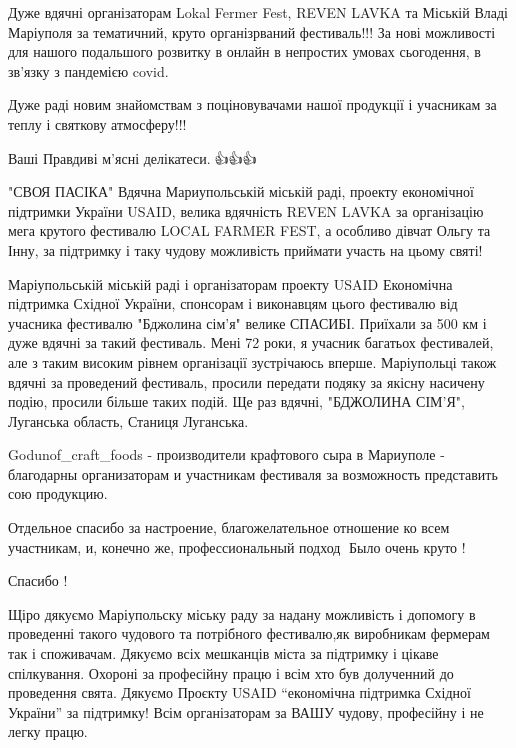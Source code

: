 Дуже вдячні організаторам Lokal Fermer Fest, REVEN LAVKA та Міській Владі
Маріуполя за тематичний, круто організрваний фестиваль!!! За нові можливості
для нашого подальшого розвитку в онлайн в непростих умовах сьогодення, в
зв'язку з пандемією covid.

Дуже раді новим знайомствам з поціновувачами нашої продукції і учасникам за теплу і святкову атмосферу!!!

Ваші Правдиві м'ясні делікатеси.🥰👍👍👍


"СВОЯ ПАСІКА" Вдячна Мариупольській міській раді, проекту економічної підтримки
України USAID, велика вдячність REVEN LAVKA за організацію мега крутого
фестивалю LOCAL FARMER FEST, а особливо дівчат Ольгу та Інну, за підтримку і
таку чудову можливість приймати участь на цьому святі!


Маріупольській міській раді і організаторам проекту USAID Економічна підтримка
Східної України, спонсорам і виконавцям цього фестивалю від учасника фестивалю
"Бджолина сім'я" велике СПАСИБІ. Приїхали за 500 км і дуже вдячні за такий
фестиваль. Мені 72 роки, я учасник багатьох фестивалей, але з таким високим
рівнем організації зустрічаюсь вперше. Маріупольці також вдячні за проведений
фестиваль, просили передати подяку за якісну насичену подію, просили більше
таких подій. Ще раз вдячні, "БДЖОЛИНА СІМ'Я", Луганська область, Станиця
Луганська.


Godunof\_craft\_foods - производители крафтового сыра в Мариуполе - благодарны
организаторам и участникам фестиваля за возможность представить сою продукцию.

Отдельное спасибо за настроение, благожелательное отношение ко всем участникам,
и, конечно же, профессиональный подход👏 Было очень круто !

Спасибо !


Щіро дякуємо Маріупольску міську раду за надану можливість і допомогу в
проведенні такого чудового та потрібного фестивалю,як виробникам фермерам так і
споживачам. Дякуємо всіх мешканців міста за підтримку і цікаве спілкування.
Охороні за професійну працю і всім хто був долученний до проведення свята.
Дякуємо Проєкту USAID \enquote{економічна підтримка Східної України} за підтримку! Всім
організаторам за ВАШУ чудову, професійну і не легку працю.

